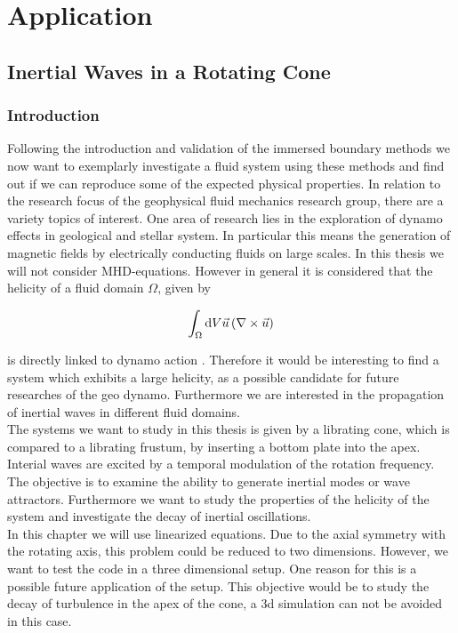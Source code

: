 \part{Application}
\chapter{Inertial Waves in a Rotating Cone}

\section{Introduction}

Following the introduction and validation of the immersed boundary methods
we now want to exemplarly investigate a fluid system using these methods
and find out if we can reproduce some of the expected physical properties.
In relation to the research focus of the geophysical fluid mechanics research group, there are a variety
topics of interest.
One area of research lies in the exploration of dynamo effects in geological and stellar system.
In particular this means the generation of magnetic fields by electrically conducting fluids on large scales.
In this thesis we will not consider MHD-equations.
However in general it is considered that the helicity of a fluid domain $\Omega$, given by

\begin{align}
    \int_{\Omega}\mathop{}\!\mathrm{d} V  \vec{u} \left( \nabla \times \vec{u} \right)
\end{align}

is directly linked to dynamo action \citep{moffat1978}.
Therefore it would be interesting to find a system which exhibits a large helicity,
as a possible candidate for future researches of the geo dynamo.
Furthermore we are interested in the propagation of inertial waves in different fluid domains.\\
The systems we want to study in this thesis is given by a librating cone, which is compared to
a librating frustum, by inserting a bottom plate into the apex.
Interial waves are excited by a temporal modulation of the rotation frequency.
The objective is to examine the ability to generate inertial modes or wave attractors.
Furthermore we want to study the properties of the helicity of the system and investigate the
decay of inertial oscillations.\\
In this chapter we will use linearized equations. Due to the axial symmetry with the rotating axis,
this problem could be reduced to two dimensions.
However, we want to test the code in a three dimensional setup.
One reason for this is a possible future application of the setup.
This objective would be to study the decay of turbulence in the apex of the cone,
a 3d simulation can not be avoided in this case.



